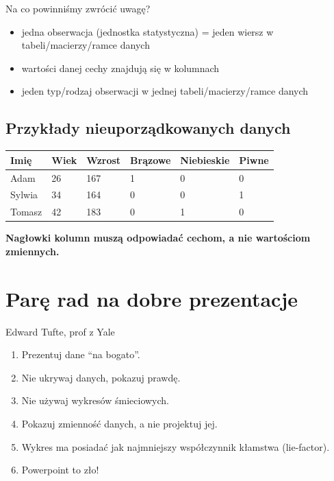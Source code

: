 \documentclass[
  polish,
  letterpaper,
  DIV=11,
  numbers=noendperiod]{scrreprt}
\providecommand{\tightlist}{%
  \setlength{\itemsep}{0pt}\setlength{\parskip}{0pt}}
\begin{document}
Na co powinniśmy zwrócić uwagę?

\begin{itemize}
\tightlist
\item
  jedna obserwacja (jednostka statystyczna) = jeden wiersz w
  tabeli/macierzy/ramce danych
\item
  wartości danej cechy znajdują się w kolumnach
\item
  jeden typ/rodzaj obserwacji w jednej tabeli/macierzy/ramce danych
\end{itemize}

\subsection{Przykłady nieuporządkowanych
danych}\label{przykux142ady-nieuporzux105dkowanych-danych}

\begin{longtable}[]{@{}llllll@{}}
\toprule\noalign{}
Imię & Wiek & Wzrost & Brązowe & Niebieskie & Piwne \\
\midrule\noalign{}
\endhead
\bottomrule\noalign{}
\endlastfoot
Adam & 26 & 167 & 1 & 0 & 0 \\
Sylwia & 34 & 164 & 0 & 0 & 1 \\
Tomasz & 42 & 183 & 0 & 1 & 0 \\
\end{longtable}

\textbf{Nagłowki kolumn muszą odpowiadać cechom, a nie wartościom
zmiennych.}

\section{Parę rad na dobre
prezentacje}\label{parux119-rad-na-dobre-prezentacje}

Edward Tufte, prof z Yale

\begin{enumerate}
\def\labelenumi{\arabic{enumi}.}
\item
  Prezentuj dane ``na bogato''.
\item
  Nie ukrywaj danych, pokazuj prawdę.
\item
  Nie używaj wykresów śmieciowych.
\item
  Pokazuj zmienność danych, a nie projektuj jej.
\item
  Wykres ma posiadać jak najmniejszy współczynnik kłamstwa (lie-factor).
\item
  Powerpoint to zło!
\end{enumerate}
\end{document}
